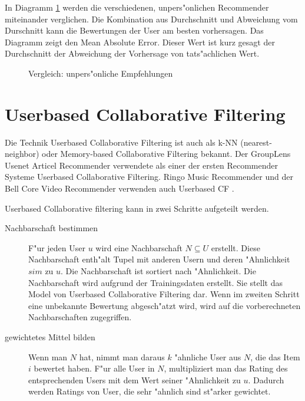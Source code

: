 \documentclass[a4paper, 12pt]{article}
\begin{document}
In Diagramm \ref{fig:maebaselines} werden die verschiedenen, unpers"onlichen Recommender miteinander verglichen. Die Kombination aus Durchschnitt und Abweichung vom Durschnitt kann die Bewertungen der User am besten vorhersagen. Das Diagramm zeigt den Mean Absolute Error. Dieser Wert ist kurz gesagt der Durchschnitt der Abweichung der Vorhersage von tats"achlichen Wert.

\begin{figure}
  \centering
{}
  
  \caption{Vergleich: unpers"onliche Empfehlungen}
  \label{fig:maebaselines}
\end{figure}


\section{Userbased Collaborative Filtering}

Die Technik Userbased Collaborative Filtering ist auch als k-NN (nearest-neighbor) oder Memory-based Collaborative Filtering bekannt. Der GroupLens Usenet Articel Recommender verwendete als einer der ersten Recommender Systeme Userbased Collaborative Filtering. Ringo Music Recommender und der Bell Core Video Recommender verwenden auch Userbased CF \cite{ekstrand11}.

Userbased Collaborative filtering kann in zwei Schritte aufgeteilt werden. 

\begin{description}
\item[Nachbarschaft bestimmen] F"ur jeden User $u$ wird eine Nachbarschaft $N \subseteq U$ erstellt. Diese Nachbarschaft enth"alt Tupel mit anderen Usern und deren "Ahnlichkeit $sim$ zu $u$. Die Nachbarschaft ist sortiert nach "Ahnlichkeit. Die Nachbarschaft wird aufgrund der Trainingsdaten erstellt. Sie stellt das Model von Userbased Collaborative Filtering dar. Wenn im zweiten Schritt eine unbekannte Bewertung abgesch"atzt wird, wird auf die vorberechneten Nachbarschaften zugegriffen.
\item [gewichtetes Mittel bilden] Wenn man $N$ hat, nimmt man daraus $k$ "ahnliche User aus $N$, die das Item $i$ bewertet haben. F"ur alle User in $N$, multipliziert man das Rating des entsprechenden Users mit dem Wert seiner "Ahnlichkeit zu $u$. Dadurch werden Ratings von User, die sehr "ahnlich sind st"arker gewichtet. 
\end{description}
\end{document}
